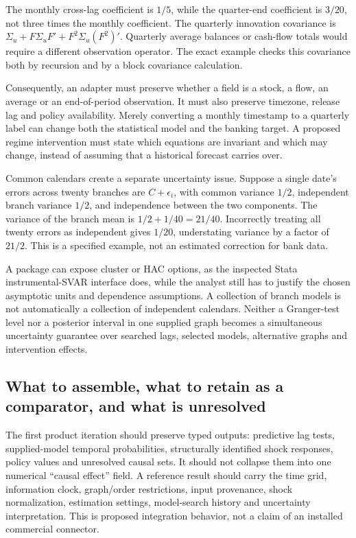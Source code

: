 The monthly cross-lag coefficient is \(1/5\), while the quarter-end
coefficient is \(3/20\), not three times the monthly coefficient. The
quarterly innovation covariance is
\(\Sigma_u+F\Sigma_uF'+F^2\Sigma_u(F^2)'\). Quarterly average balances
or cash-flow totals would require a different observation operator. The
exact example checks this covariance both by recursion and by a block
covariance calculation.~\citep{exec13_ct_examples}

Consequently, an adapter must preserve whether a field is a stock, a
flow, an average or an end-of-period observation. It must also preserve
timezone, release lag and policy availability. Merely converting a
monthly timestamp to a quarterly label can change both the statistical
model and the banking target. A proposed regime intervention must state
which equations are invariant and which may change, instead of assuming
that a historical forecast carries over.

Common calendars create a separate uncertainty issue. Suppose a single
date's errors across twenty branches are \(C+\epsilon_i\), with common
variance \(1/2\), independent branch variance \(1/2\), and independence
between the two components. The variance of the branch mean is
\(1/2+1/40=21/40\). Incorrectly treating all twenty errors as
independent gives \(1/20\), understating variance by a factor of
\(21/2\). This is a specified example, not an estimated correction for
bank data. \citep{exec13_ct_examples}

A package can expose cluster or HAC options, as the inspected Stata
instrumental-SVAR interface does, while the analyst still has to justify
the chosen asymptotic units and dependence assumptions. A collection of
branch models is not automatically a collection of independent
calendars. Neither a Granger-test level nor a posterior interval in one
supplied graph becomes a simultaneous uncertainty guarantee over
searched lags, selected models, alternative graphs and intervention
effects.

\hypertarget{what-to-assemble-what-to-retain-as-a-comparator-and-what-is-unresolved}{%
\subsection{What to assemble, what to retain as a comparator, and what
is
unresolved}\label{what-to-assemble-what-to-retain-as-a-comparator-and-what-is-unresolved}}

The first product iteration should preserve typed outputs: predictive
lag tests, supplied-model temporal probabilities, structurally
identified shock responses, policy values and unresolved causal sets. It
should not collapse them into one numerical ``causal effect'' field. A
reference result should carry the time grid, information clock,
graph/order restrictions, input provenance, shock normalization,
estimation settings, model-search history and uncertainty
interpretation. This is proposed integration behavior, not a claim of an
installed commercial connector.

